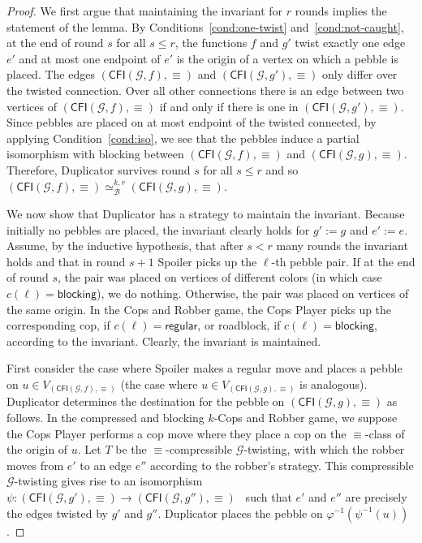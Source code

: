 \documentclass[10pt,a4paper]{article}
\newcommand{\regular}{\mathsf{regular}}
\newcommand{\blocking}{\mathsf{blocking}}
\renewcommand{\phi}{\varphi}
\newcommand{\inv}[1]{#1^{-1}}
\newcommand{\comp}{\equiv}
\newcommand{\CFIsym}{\mathsf{CFI}}
\newcommand{\CFI}[1]{\CFIsym(#1)}
\newcommand{\precompCFI}[2]{{(\CFI{#1},#2)}}
\newcommand{\graphG}{\mathcal{G}}
\newcommand{\kbequivr}[2]{\simeq_{\mathcal{B}}^{#1,#2}}
\begin{document}
\begin{proof}
        \noindent We first argue that maintaining the invariant for $r$ rounds implies the statement of the lemma.
        By Conditions~\ref{cond:one-twist} and~\ref{cond:not-caught}, at the end of round $s$ for all $s \le r$,
        the functions $f$ and $g'$
        twist exactly one edge $e'$
        and at most one endpoint of $e'$ is the origin of a vertex on which a pebble is placed.
        The edges $\precompCFI{\graphG,f}{\comp}$ and $\precompCFI{\graphG,g'}{\comp}$ only differ over the twisted connection. Over all other connections
      there is an edge between two vertices of $\precompCFI{\graphG,f}{\comp}$  if and only if there is one in $\precompCFI{\graphG,g'}{\comp}$.
        Since pebbles are placed on at most endpoint of the twisted connected, 
        by applying Condition~\ref{cond:iso}, we see that the pebbles induce a partial isomorphism with blocking between $\precompCFI{\graphG,f}{\comp}$ and $\precompCFI{\graphG,g}{\comp}$.
        Therefore, Duplicator survives round $s$ for all $s \le r$ and so $\precompCFI{\graphG,f}{\comp} \kbequivr{k}{r} \precompCFI{\graphG,g}{\comp}$.
        
        We now show that Duplicator has a strategy to maintain the invariant.
        Because initially no pebbles are placed, the invariant clearly holds for $g' := g$ and $e' := e$.
        Assume, by the inductive hypothesis, that after $s<r$ many rounds the invariant holds and that in round $s+1$ Spoiler picks up the $\ell$-th pebble pair.
        If at the end of round $s$, the pair was placed on vertices of different colors (in which case $c(\ell) = \blocking$), we do nothing.
        Otherwise, the pair was placed on vertices of the same origin.
        In the Cops and Robber game, the Cops Player picks up the corresponding cop, if $c(\ell)=\regular$, or roadblock, if $c(\ell) =\blocking$, according to the invariant.
        Clearly, the invariant is maintained.
        
        First consider the case where Spoiler makes a regular move
        and places a pebble on $u \in V_{\precompCFI{\graphG,f}{\comp}}$
        (the case where $u \in V_{\precompCFI{\graphG,g}{\comp}}$ is analogous).
        Duplicator determines the destination for the pebble on $\precompCFI{\graphG,g}{\comp}$ as follows.
        In the compressed and blocking $k$-Cops and Robber game, we suppose the Cops Player performs a cop move where they place a cop  on the $\comp$-class of the origin of $u$.
        Let $T$ be the $\comp$-compressible $\graphG$-twisting, with which the robber
        moves from $e'$ to an edge $e''$ according to the robber's strategy.
        This compressible $\graphG$-twisting gives rise to an isomorphism $\psi \colon \precompCFI{\graphG,g'}{\comp} \to \precompCFI{\graphG,g''}{\comp}$~\cite[Lemma~12]{DBLP:conf/focs/GroheLNS23} such that $e'$ and $e''$ are precisely the edges twisted by $g'$ and $g''$.
        Duplicator places the pebble on $\inv{\phi}(\inv{\psi}(u))$.
        

\end{proof}
\end{document}
